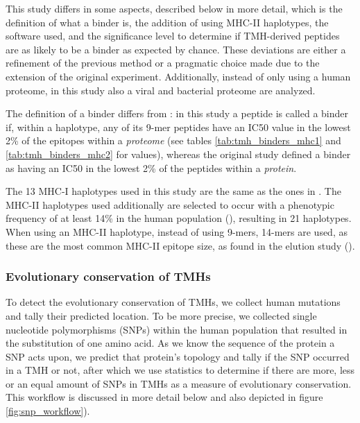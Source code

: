 This study differs in some aspects, described below in more detail,
which is the definition of what a binder is,
the addition of using MHC-II haplotypes, the software used,
and the significance level to determine if TMH-derived peptides are as 
likely to be a binder as expected by chance.
These deviations are either a refinement of the previous method or
a pragmatic choice made due to the extension of the original experiment.
Additionally, instead of only using a human proteome, in this study
also a viral and bacterial proteome are analyzed.

The definition of a binder differs from \cite{bianchi2017}:
in this study a peptide is called a binder if, within a haplotype, 
any of its 9-mer peptides have an IC50 value in the lowest 2\% of 
the epitopes within a 
\emph{proteome} (see tables \ref{tab:tmh_binders_mhc1} and \ref{tab:tmh_binders_mhc2}
for values), whereas the original study defined
a binder as having an IC50 in the lowest 2\% 
of the peptides within a \emph{protein}.

The 13 MHC-I haplotypes used in this study are the same as 
the ones in \cite{bianchi2017}.
The MHC-II haplotypes used additionally are selected 
to occur with a phenotypic frequency of at least 14\% in
the human population (\cite{greenbaum2011functional}),
resulting in 21 haplotypes.
When using an MHC-II haplotype, instead of using 9-mers, 14-mers are
used, as these are the most common MHC-II epitope size,
as found in the elution study (\cite{bergseng2015different}).

\subsubsection{Evolutionary conservation of TMHs}


To detect the evolutionary conservation of TMHs, 
we collect human mutations and 
tally their predicted location.
To be more precise, we collected single nucleotide
polymorphisms (SNPs) within the human population
that resulted in the substitution of one amino acid.
As we know the sequence of the protein a SNP acts upon,
we predict that protein's topology and tally if
the SNP occurred in a TMH or not, 
after which we use statistics to determine if there are
more, less or an equal amount of SNPs in TMHs
as a measure of evolutionary conservation.
This workflow is discussed in more detail below and also
depicted in figure \ref{fig:snp_workflow}).

